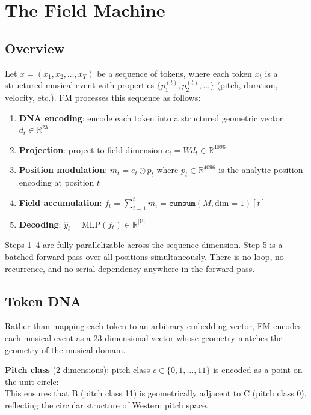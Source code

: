 \documentclass[11pt]{article}
\begin{document}
\section{The Field Machine}

\subsection{Overview}

Let $x = (x_1, x_2, \ldots, x_T)$ be a sequence of tokens, where each token $x_t$ is a structured musical event with properties $\{p_1^{(t)}, p_2^{(t)}, \ldots\}$ (pitch, duration, velocity, etc.). FM processes this sequence as follows:

\begin{enumerate}
    \item \textbf{DNA encoding}: encode each token into a structured geometric vector $d_t \in \mathbb{R}^{23}$
    \item \textbf{Projection}: project to field dimension $e_t = W d_t \in \mathbb{R}^{4096}$
    \item \textbf{Position modulation}: $m_t = e_t \odot p_t$ where $p_t \in \mathbb{R}^{4096}$ is the analytic position encoding at position $t$
    \item \textbf{Field accumulation}: $f_t = \sum_{i=1}^{t} m_i = \texttt{cumsum}(M, \text{dim}=1)[t]$
    \item \textbf{Decoding}: $\hat{y}_t = \text{MLP}(f_t) \in \mathbb{R}^{|\mathcal{V}|}$
\end{enumerate}

Steps 1--4 are fully parallelizable across the sequence dimension. Step 5 is a batched forward pass over all positions simultaneously. There is no loop, no recurrence, and no serial dependency anywhere in the forward pass.

\subsection{Token DNA}

Rather than mapping each token to an arbitrary embedding vector, FM encodes each musical event as a 23-dimensional vector whose geometry matches the geometry of the musical domain.

\textbf{Pitch class} (2 dimensions): pitch class $c \in \{0, 1, \ldots, 11\}$ is encoded as a point on the unit circle:
\begin{equation}
[\sin(2\pi c / 12),\ \cos(2\pi c / 12)]
\end{equation}
This ensures that B (pitch class 11) is geometrically adjacent to C (pitch class 0), reflecting the circular structure of Western pitch space.
\end{document}
